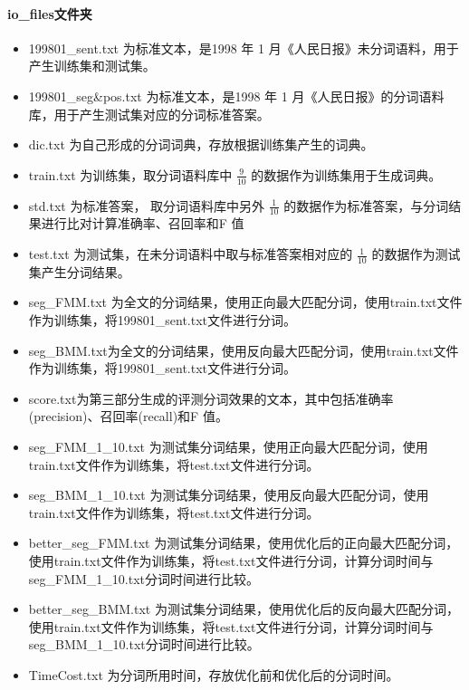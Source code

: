 \documentclass[11pt,a4paper]{article}
\begin{document}
	\paragraph{io\_files文件夹}
	\begin{itemize}
		\item 199801\_sent.txt 为标准文本，是1998 年 1 月《人民日报》未分词语料，用于产生训练集和测试集。
		\item 199801\_seg\&pos.txt 为标准文本，是1998 年 1 月《人民日报》的分词语料库，用于产生测试集对应的分词标准答案。
		\item dic.txt 为自己形成的分词词典，存放根据训练集产生的词典。
		\item train.txt 为训练集，取分词语料库中 $\frac{9}{10}$ 的数据作为训练集用于生成词典。
		\item std.txt 为标准答案， 取分词语料库中另外 $\frac{1}{10}$ 的数据作为标准答案，与分词结果进行比对计算准确率、召回率和F 值
		\item test.txt 为测试集，在未分词语料中取与标准答案相对应的 $\frac{1}{10}$ 的数据作为测试集产生分词结果。
		\item seg\_FMM.txt 为全文的分词结果，使用正向最大匹配分词，使用train.txt文件作为训练集，将199801\_sent.txt文件进行分词。
		\item seg\_BMM.txt为全文的分词结果，使用反向最大匹配分词，使用train.txt文件作为训练集，将199801\_sent.txt文件进行分词。
		\item score.txt为第三部分生成的评测分词效果的文本，其中包括准确率(precision)、召回率(recall)和F 值。
		\item seg\_FMM\_1\_10.txt 为测试集分词结果，使用正向最大匹配分词，使用train.txt文件作为训练集，将test.txt文件进行分词。
		\item seg\_BMM\_1\_10.txt 为测试集分词结果，使用反向最大匹配分词，使用train.txt文件作为训练集，将test.txt文件进行分词。
		\item better\_seg\_FMM.txt 为测试集分词结果，使用优化后的正向最大匹配分词，使用train.txt文件作为训练集，将test.txt文件进行分词，计算分词时间与seg\_FMM\_1\_10.txt分词时间进行比较。
		\item better\_seg\_BMM.txt 为测试集分词结果，使用优化后的反向最大匹配分词，使用train.txt文件作为训练集，将test.txt文件进行分词，计算分词时间与seg\_BMM\_1\_10.txt分词时间进行比较。
		\item TimeCost.txt 为分词所用时间，存放优化前和优化后的分词时间。
	\end{itemize}
	
\end{document}
